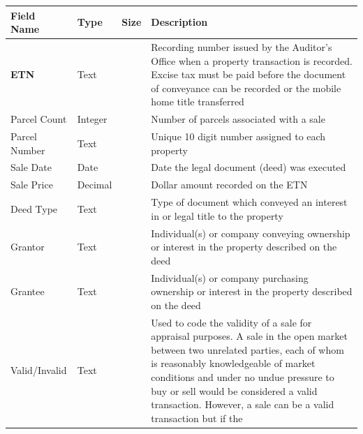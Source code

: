 \documentclass[
  english,
  letterpaper,
  DIV=11,
  numbers=noendperiod]{scrreprt}
\begin{document}
\begin{longtable}[]{@{}
  >{\raggedright\arraybackslash}p{}
  >{\raggedright\arraybackslash}p{}
  >{\raggedright\arraybackslash}p{}
  >{\raggedright\arraybackslash}p{}@{}}
\toprule\noalign{}
\begin{minipage}[b]{\linewidth}\raggedright
Field Name
\end{minipage} & \begin{minipage}[b]{\linewidth}\raggedright
Type
\end{minipage} & \begin{minipage}[b]{\linewidth}\raggedright
Size
\end{minipage} & \begin{minipage}[b]{\linewidth}\raggedright
Description
\end{minipage} \\
\midrule\noalign{}
\endhead
\bottomrule\noalign{}
\endlastfoot
\textbf{ETN} & Text & 11 & Recording number issued by the Auditor's
Office when a property transaction is recorded. Excise tax must be paid
before the document of conveyance can be recorded or the mobile home
title transferred \\
Parcel Count & Integer & & Number of parcels associated with a sale \\
Parcel Number & Text & 10 & Unique 10 digit number assigned to each
property \\
Sale Date & Date & & Date the legal document (deed) was executed \\
Sale Price & Decimal & 15.2 & Dollar amount recorded on the ETN \\
Deed Type & Text & 40 & Type of document which conveyed an interest in
or legal title to the property \\
Grantor & Text & 80 & Individual(s) or company conveying ownership or
interest in the property described on the deed \\
Grantee & Text & 80 & Individual(s) or company purchasing ownership or
interest in the property described on the deed \\
Valid/Invalid & Text & 7 & Used to code the validity of a sale for
appraisal purposes. A sale in the open market between two unrelated
parties, each of whom is reasonably knowledgeable of market conditions
and under no undue pressure to buy or sell would be considered a valid
transaction. However, a sale can be a valid transaction but if the

\end{longtable}
\end{document}
